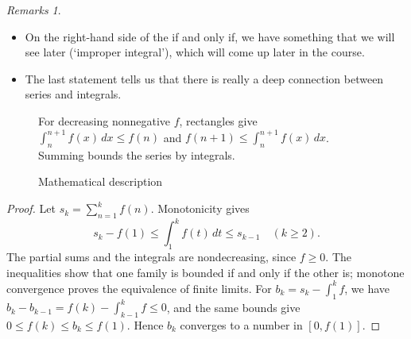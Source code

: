 \documentclass[11pt]{article}
\numberwithin{equation}{section}
\theoremstyle{definition}
\theoremstyle{remark}
\newtheorem{remarks}[theorem]{Remarks}
\begin{document}
\begin{remarks}\label{analysis-unit-0049}
    \begin{itemize}
        \item On the right-hand side of the if and only if, we have something that we will see later (`improper integral'), which will come up later in the course.
        \item The last statement tells us that there is really a deep connection between series and integrals.
    \end{itemize}
\end{remarks}

\begin{figure}[ht!]\centering\begin{minipage}{.94\linewidth}For decreasing nonnegative \(f\), rectangles give \(\int_n^{n+1}f(x)\,dx\le f(n)\) and \(f(n+1)\le\int_n^{n+1}f(x)\,dx\). Summing bounds the series by integrals.\end{minipage}\caption{Mathematical description}\label{fig:series-integral-test}\end{figure}

\begin{proof}
Let \(s_k=\sum_{n=1}^k f(n)\). Monotonicity gives
\[
s_k-f(1)\le\int_1^k f(t)\,dt\le s_{k-1}\quad(k\ge2).
\]
The partial sums and the integrals are nondecreasing, since \(f\ge0\).
The inequalities show that one family is bounded if and only if the other is;
monotone convergence proves the equivalence of finite limits.
For \(b_k=s_k-\int_1^k f\), we have
\(b_k-b_{k-1}=f(k)-\int_{k-1}^k f\le0\), and the same bounds give
\(0\le f(k)\le b_k\le f(1)\). Hence \(b_k\) converges to a number in \([0,f(1)]\).
\end{proof}
\end{document}

